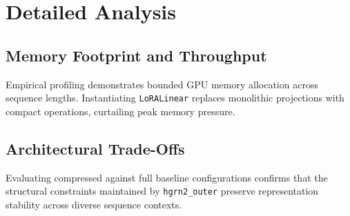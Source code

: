 \section{Detailed Analysis}

\subsection{Memory Footprint and Throughput}
Empirical profiling demonstrates bounded GPU memory allocation across sequence lengths. Instantiating \texttt{LoRALinear} replaces monolithic projections with compact operations, curtailing peak memory pressure.

\subsection{Architectural Trade-Offs}
Evaluating compressed against full baseline configurations confirms that the structural constraints maintained by \texttt{hgrn2_outer} preserve representation stability across diverse sequence contexts.

